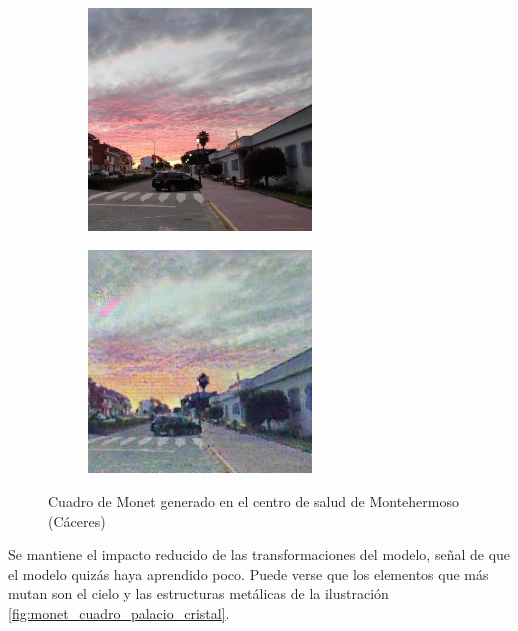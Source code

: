 \documentclass[[../main.tex]{subfiles}
\begin{document}
        \begin{figure}[!htb]
            \begin{subfigure}[b]{0.49\textwidth}
            \includegraphics[width=0.65\textwidth]{imagenes/imagen2cuadro/propias/monet/photo_2020-07-01_21-19-44.jpg}
            \end{subfigure}
        \hfill
            \begin{subfigure}[b]{0.49\textwidth}
            \includegraphics[width=0.65\textwidth]{imagenes/imagen2cuadro/propias/monet/photo_2020-07-01_21-19-44_2.jpg}
            \end{subfigure}
        \caption{Cuadro de Monet generado en el centro de salud de Montehermoso (Cáceres)}
        \label{fig:monet_cuadro_montehermoso}
        \end{figure}
        
        Se mantiene el impacto reducido de las transformaciones del modelo, señal de que el modelo quizás haya aprendido poco. Puede verse que los elementos que más mutan son el cielo y las estructuras metálicas de la ilustración \ref{fig:monet_cuadro_palacio_cristal}.
        
\end{document}
